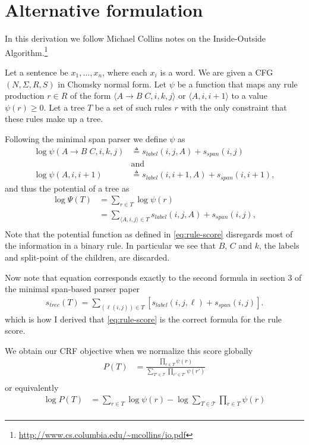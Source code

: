 \documentclass[examplefnt,biber]{nowfnt} %
\begin{document}
\section{Alternative formulation}

In this derivation we follow Michael Collins notes on the Inside-Outside Algorithm.\footnote{\url{http://www.cs.columbia.edu/~mcollins/io.pdf}}

Let a sentence be $x_1,\dots,x_n$, where each $x_i$
is a word. We are given a CFG $(N, \Sigma, R, S)$ in Chomsky normal
form. Let $\psi$ be a function that maps any rule production $r \in R$ of the form $\langle A \to B \;C, i, k, j \rangle$ or $\langle A, i, i+1 \rangle$ to a value $\psi(r) \geq 0$. Let a tree $T$ be a set of such rules $r$ with the only constraint that these rules make up a tree.

Following the minimal span parser we define $\psi$ as
\begin{align}
\label{eq:rule-score}
    \log\psi(A \to B \;C, i, k, j) &\triangleq s_{label}(i, j, A) + s_{span}(i, j) \\
    &\text{and} \\
    \log\psi(A, i, i+1) &\triangleq s_{label}(i, i+1, A) + s_{span}(i, i+1),
\end{align}
and thus the potential of a tree as
\begin{align}
\label{eq:tree-score}
    \log\Psi(T) &= \sum_{r \in T} \log\psi(r) \\
        &= \sum_{\langle A, i, j \rangle \in T} s_{label}(i, j, A) + s_{span}(i, j), \\
\end{align}
Note that the potential function as defined in \ref{eq:rule-score} disregards most of the information in a binary rule. In particular we see that $B$, $C$ and $k$, the labels and split-point of the children, are discarded.

Now note that equation \label{eq:tree-score} corresponds exactly to the second formula in section 3 of the minimal span-based parser paper
\begin{align}
s_{tree}(T) = \sum_{(\ell(i,j))\in T}[s_{label}(i, j, \ell) + s_{span}(i, j)] .
\end{align}
which is how I derived that \ref{eq:rule-score} is the correct formula for the rule score.

We obtain our CRF objective when we normalize this score globally
\begin{align}
\label{eq:crf-objective}
    P(T) &= \frac{\prod_{r \in T} \psi(r)}{\sum_{T' \in \mathcal{T}} \prod_{r' \in T'} \psi(r')} \\
\end{align}
or equivalently
\begin{align}
\label{eq:logcrf-objective}
    \log P(T) &= \sum_{r \in T} \log \psi(r) - \log \sum_{T \in \mathcal{T}} \prod_{r \in T} \psi(r) \\
\end{align}
\end{document}
